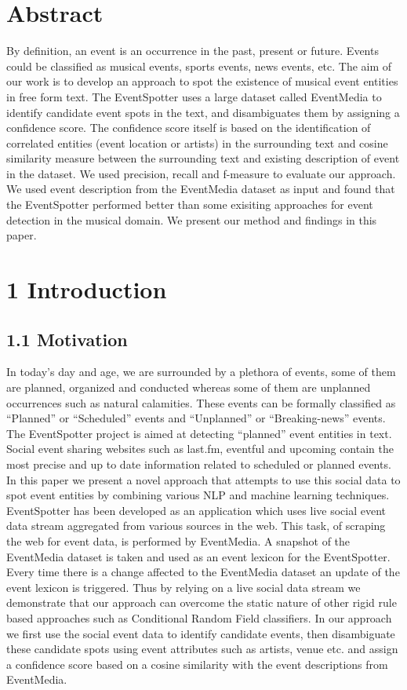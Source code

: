 \documentclass[a4paper,11pt]{report}
\begin{document}
\chapter*{Abstract}
By definition, an event is an occurrence in the past, present or future. Events could be classified as musical events, sports events, news events, etc. The aim of our work is to develop an approach to spot the existence of musical event entities in free form text. The EventSpotter uses a large dataset called EventMedia to identify candidate event spots in the text, and disambiguates them by assigning a confidence score. The confidence score itself is based on the identification of correlated entities (event location or artists) in the surrounding text and cosine similarity measure between the surrounding text and existing description of event in the dataset. We used precision, recall and f-measure to evaluate our approach. We used event description from the EventMedia dataset as input and found that the EventSpotter performed better than some exisiting approaches for event detection in the musical domain. We present our method and findings in this paper.

\chapter*{1 Introduction}
\section*{1.1 Motivation}
In today's day and age, we are surrounded by a plethora of events, some of them are planned, organized and conducted whereas some of them are unplanned occurrences such as natural calamities. These events can be formally classified as ``Planned'' or ``Scheduled'' events and ``Unplanned'' or ``Breaking-news'' events. The EventSpotter project is aimed at detecting ``planned'' event entities in text. Social event sharing websites such as last.fm, eventful and upcoming contain the most precise and up to date information related to scheduled or planned events. In this paper we present a novel approach that attempts to use this social data to spot event entities by combining various NLP and machine learning techniques. EventSpotter has been developed as an application which uses live social event data stream aggregated from various sources in the web. This task, of scraping the web for event data, is performed by EventMedia\cite{EURECOM+3865}. A snapshot of the EventMedia dataset is taken and used as an event lexicon for the EventSpotter. Every time there is a change affected to the EventMedia dataset an update of the event lexicon is triggered. Thus by relying on a live social data stream we demonstrate that our approach can overcome the static nature of other rigid rule based approaches such as Conditional Random Field classifiers. In our approach we first use the social event data to identify candidate events, then disambiguate these candidate spots using event attributes such as artists, venue etc. and assign a confidence score based on a cosine similarity with the event descriptions from EventMedia. 
\end{document}
